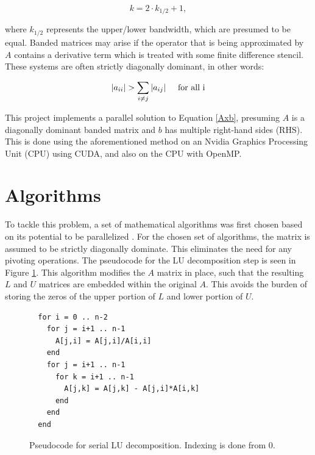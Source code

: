 \documentclass[12pt]{article}
\begin{document}
\begin{equation}
\label{half_k}
k = 2 \cdot k_{1/2} + 1,
\end{equation}

\noindent
where $k_{1/2}$ represents the upper/lower bandwidth, which are presumed
to be equal. Banded matrices may arise if the operator that is being
approximated by $A$ contains a derivative term which is treated with some
finite difference stencil. These systems are often strictly diagonally
dominant, in other words:

\begin{equation}
|a_{ii}| > \sum\limits_{i \neq j} |a_{ij}| \hspace{0.5cm} \mbox{for all i}
\end{equation}


This project implements a parallel solution to Equation \ref{Axb}, presuming $A$
is a diagonally dominant banded matrix and $b$ has multiple right-hand sides (RHS).
This is done using the aforementioned method on an Nvidia Graphics Processing Unit (CPU) using CUDA, and also on the CPU with OpenMP.

\section{Algorithms}
\label{sec:algorithms}

To tackle this problem, a set of mathematical algorithms was first chosen
based on its potential to be parallelized \cite{Heath}. For the chosen set of
algorithms, the matrix is assumed to be strictly diagonally dominate. This
eliminates the need for any pivoting operations. The pseudocode for the LU
decomposition step is seen in Figure \ref{LUcode}. This algorithm modifies the $A$
matrix in place, such that the resulting $L$ and $U$ matrices are embedded
within the original $A$. This avoids the burden of storing the zeros of the
upper portion of $L$ and lower portion of $U$.

\begin{figure}[H]
\caption{Pseudocode for serial LU decomposition. Indexing is done from 0.}
\label{LUcode}
\begin{lstlisting}
  for i = 0 .. n-2
    for j = i+1 .. n-1
      A[j,i] = A[j,i]/A[i,i]
    end
    for j = i+1 .. n-1
      for k = i+1 .. n-1
        A[j,k] = A[j,k] - A[j,i]*A[i,k]
      end
    end
  end
\end{lstlisting}
\end{figure}
\end{document}
